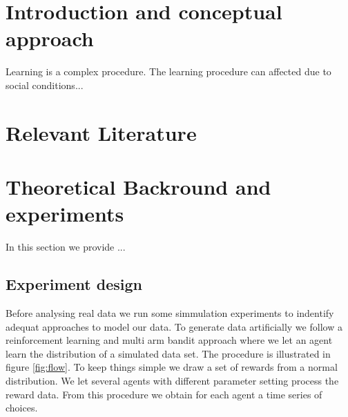\documentclass[12pt,a4paper,bibliography=totocnumbered,listof=totocnumbered]{scrartcl}
\begin{document}



\section{Introduction and conceptual approach}

Learning is a complex procedure. The learning procedure can affected due to social conditions... 


\pagebreak

\section{Relevant Literature}


\pagebreak

\section{Theoretical Backround and experiments}

In this section we provide ... 

\subsection{Experiment design}

Before analysing real data we run some simmulation experiments to indentify adequat approaches to model our data. To generate data artificially we follow a reinforcement learning and multi arm bandit approach where we let an agent learn the distribution of a simulated data set. The procedure is illustrated in figure \ref{fig:flow}. To keep things simple we draw a set of rewards from a normal distribution. We let several agents with different parameter setting process the reward data. From this procedure we obtain for each agent a time series of choices. 
\end{document}
